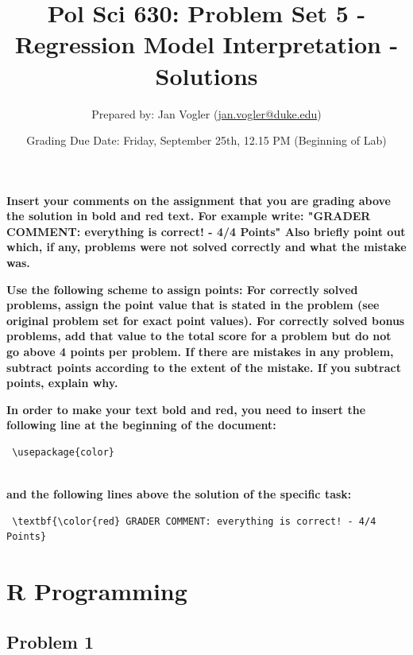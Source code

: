 \documentclass[12pt,letter]{article}\usepackage[]{graphicx}\usepackage[]{color}
\begin{document}
\title{Pol Sci 630: Problem Set 5 - Regression Model Interpretation - Solutions}

\author{Prepared by: Jan Vogler (\href{mailto:jan.vogler@duke.edu}{jan.vogler@duke.edu})}

\date{Grading Due Date: Friday, September 25th, 12.15 PM (Beginning of Lab)}
 
\maketitle



\textbf{\color{red} Insert your comments on the assignment that you are grading above the solution in bold and red text. For example write: "GRADER COMMENT: everything is correct! - 4/4 Points" Also briefly point out which, if any, problems were not solved correctly and what the mistake was.}

\bigskip

\textbf{Use the following scheme to assign points: For correctly solved problems, assign the point value that is stated in the problem (see original problem set for exact point values). For correctly solved bonus problems, add that value to the total score for a problem but do not go above 4 points per problem. If there are mistakes in any problem, subtract points according to the extent of the mistake. If you subtract points, explain why.}

\bigskip

\textbf{In order to make your text bold and red, you need to insert the following line at the beginning of the document:}

\begin{verbatim} \usepackage{color} \end{verbatim}

\\ \textbf{and the following lines above the solution of the specific task:}

\begin{verbatim} \textbf{\color{red} GRADER COMMENT: everything is correct! - 4/4 Points} \end{verbatim}



\section*{R Programming}

\subsection*{Problem 1}
\end{document}
